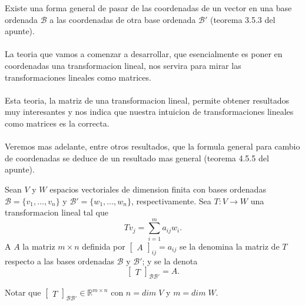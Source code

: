 \documentclass{article}
\theoremstyle{definition}
\theoremstyle{definition}
\theoremstyle{remark}
\begin{document}
  Existe una forma general de pasar de las coordenadas de un vector en una base ordenada $\mathcal{B}$ a las coordenadas de otra base ordenada $\mathcal{B}'$ (teorema 3.5.3 del apunte). \\\\ La teoria que vamos a comenzar a desarrollar, que esencialmente es poner en coordenadas una transformacion lineal, nos servira para mirar las transformaciones lineales como matrices. \\\\ Esta teoria, la matriz de una transformacion lineal, permite obtener resultados muy interesantes y nos indica que nuestra intuicion de transformaciones lineales como matrices es la correcta. \\\\ Veremos mas adelante, entre otros resultados, que la formula general para cambio de coordenadas se deduce de un resultado mas general (teorema 4.5.5 del apunte).
  \begin{defi}
    Sean $V$ y $W$ espacios vectoriales de dimension finita con bases ordenadas $\mathcal{B}=\{v_1, \dots ,v_n\}$ y $\mathcal{B}'=\{w_1, \dots ,w_n\}$, respectivamente. Sea $T : V \to W$ una transformacion lineal tal que \[
      Tv_{j}=\sum_{i=1}^{m}a_{ij}w_{i}.
    \]
    A $A$ la matriz $m \times n$ definida por $\begin{bmatrix}A\end{bmatrix}_{ij}=a_{ij}$ se la denomina la matriz de $T$ respecto a las bases ordenadas $\mathcal{B}$ y $\mathcal{B}'$; y se la denota \[
    \begin{bmatrix}T\end{bmatrix}_{\mathcal{B}\mathcal{B}'}=A.
  \]
  \end{defi}
  Notar que $\begin{bmatrix} T \end{bmatrix}_{\mathcal{B} \mathcal{B}'} \in \mathbb{R}^{m \times n}$ con $n = dim \; V$ y $ m = dim \; W$.
\end{document}
